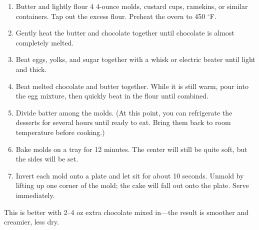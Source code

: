 
\begin{ingredients}
\end{ingredients}


\begin{recipe}
  \begin{enumerate}

  \item Butter and lightly flour 4 4-ounce molds, custard cups,
  ramekins, or similar containers.  Tap out the excess flour.  Preheat
  the overn to 450 $^\circ$F.

\item  Gently heat the butter and chocolate together until chocolate
  is almost completely melted.

\item Beat eggs, yolks, and sugar together with a whisk or electric
  beater until light and thick.

\item Beat melted chocolate and butter together.  While it is still
  warm, pour into the egg mixture, then quickly beat in the flour
  until combined.
  
\item Divide batter among the molds.  (At this point, you can
  refrigerate the desserts for several hours until ready to eat.  Bring
  them back to room temperature before cooking.)

\item Bake molds on a tray for 12 minutes.  The center will still be
  quite soft, but the sides will be set.

\item Invert each mold onto a plate and let sit for about 10 seconds.
  Unmold by lifting up one corner of the mold; the cake will fall out
  onto the plate.  Serve immediately.

  \end{enumerate}

  This is better with 2--4 oz extra chocolate mixed in---the result is
  smoother and creamier, less dry.

\end{recipe}
